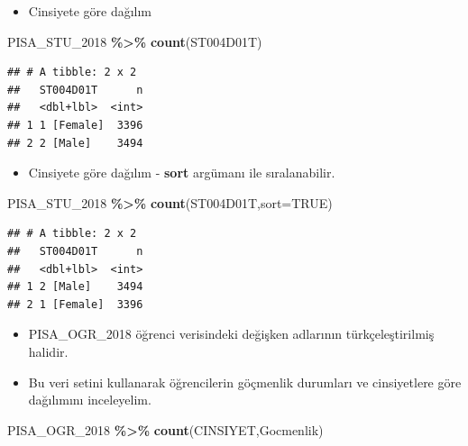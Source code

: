 \documentclass[
  oneside]{book}
\newenvironment{Shaded}{\begin{snugshade}}{\end{snugshade}}
\newcommand{\AttributeTok}[1]{\textcolor[rgb]{0.13,0.29,0.53}{#1}}
\newcommand{\ConstantTok}[1]{\textcolor[rgb]{0.56,0.35,0.01}{#1}}
\newcommand{\FunctionTok}[1]{\textcolor[rgb]{0.13,0.29,0.53}{\textbf{#1}}}
\newcommand{\NormalTok}[1]{#1}
\newcommand{\SpecialCharTok}[1]{\textcolor[rgb]{0.81,0.36,0.00}{\textbf{#1}}}
\providecommand{\tightlist}{%
  \setlength{\itemsep}{0pt}\setlength{\parskip}{0pt}}
\begin{document}
\begin{itemize}
\tightlist
\item
  Cinsiyete göre dağılım
  👦 👧
\end{itemize}

\begin{Shaded}
\begin{Highlighting}[]
\NormalTok{PISA\_STU\_2018 }\SpecialCharTok{\%\textgreater{}\%} \FunctionTok{count}\NormalTok{(ST004D01T)}
\end{Highlighting}
\end{Shaded}

\begin{verbatim}
## # A tibble: 2 x 2
##   ST004D01T      n
##   <dbl+lbl>  <int>
## 1 1 [Female]  3396
## 2 2 [Male]    3494
\end{verbatim}

\begin{itemize}
\tightlist
\item
  Cinsiyete göre dağılım - \textbf{sort} argümanı ile sıralanabilir.
  👦 👧
\end{itemize}

\begin{Shaded}
\begin{Highlighting}[]
\NormalTok{PISA\_STU\_2018 }\SpecialCharTok{\%\textgreater{}\%} \FunctionTok{count}\NormalTok{(ST004D01T,}\AttributeTok{sort=}\ConstantTok{TRUE}\NormalTok{)}
\end{Highlighting}
\end{Shaded}

\begin{verbatim}
## # A tibble: 2 x 2
##   ST004D01T      n
##   <dbl+lbl>  <int>
## 1 2 [Male]    3494
## 2 1 [Female]  3396
\end{verbatim}

\begin{itemize}
\item
  PISA\_OGR\_2018 öğrenci verisindeki değişken adlarının türkçeleştirilmiş halidir.
\item
  Bu veri setini kullanarak öğrencilerin göçmenlik durumları ve cinsiyetlere göre dağılımını inceleyelim.
\end{itemize}

\begin{Shaded}
\begin{Highlighting}[]
\NormalTok{PISA\_OGR\_2018 }\SpecialCharTok{\%\textgreater{}\%} \FunctionTok{count}\NormalTok{(CINSIYET,Gocmenlik)}
\end{Highlighting}
\end{Shaded}
\end{document}
